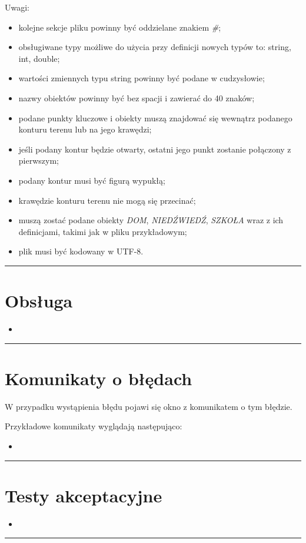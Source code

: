 \documentclass[a4paper,11pt]{article}
\newcommand{\linia}{\rule{\linewidth}{0.4mm}}
\begin{document}
Uwagi:
\begin{itemize}
\item kolejne sekcje pliku powinny być oddzielane znakiem \textit{\#};
\item obsługiwane typy możliwe do użycia przy definicji nowych typów to: string, int, double;
\item wartości zmiennych typu string powinny być podane w cudzysłowie;
\item nazwy obiektów powinny być bez spacji i zawierać do 40 znaków;
\item podane punkty kluczowe i obiekty muszą znajdować się wewnątrz podanego konturu terenu lub na jego krawędzi;
\item jeśli podany kontur będzie otwarty, ostatni jego punkt zostanie połączony z pierwszym;
\item podany kontur musi być figurą wypukłą;
\item krawędzie konturu terenu nie mogą się przecinać;
\item muszą zostać podane obiekty \textit{DOM}, \textit{NIEDŹWIEDŹ}, \textit{SZKOŁA} wraz z ich definicjami, takimi jak w pliku przykładowym;
\item plik musi być kodowany w UTF-8.
\end{itemize}
\noindent\linia
\section{Obsługa}
\begin{itemize}
\item
\end{itemize}

\noindent\linia
\section{Komunikaty o błędach}
W przypadku wystąpienia błędu pojawi się okno z komunikatem o tym błędzie.

Przykładowe komunikaty wyglądają następująco:
\begin{itemize}
\item
\end{itemize}

\noindent\linia
\section{Testy akceptacyjne}
\begin{itemize}
\item
\end{itemize}
\noindent\linia
\end{document}
